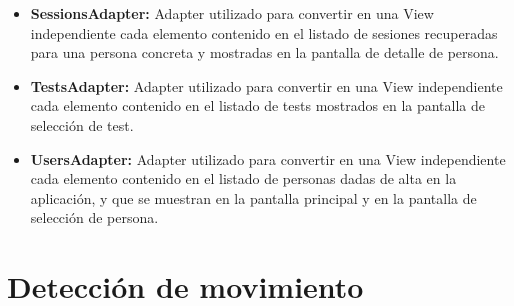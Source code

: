 \begin{itemize}
\item \textbf{SessionsAdapter:} Adapter utilizado para convertir en una View independiente cada elemento contenido en el listado de sesiones recuperadas para una persona concreta y mostradas en la pantalla de detalle de persona.
\item \textbf{TestsAdapter:} Adapter utilizado para convertir en una View independiente cada elemento contenido en el listado de tests mostrados en la pantalla de selección de test.
\item \textbf{UsersAdapter:} Adapter utilizado para convertir en una View independiente cada elemento contenido en el listado de personas dadas de alta en la aplicación, y que se muestran en la pantalla principal y en la pantalla de selección de persona.
\end{itemize}

\section{Detección de movimiento}



